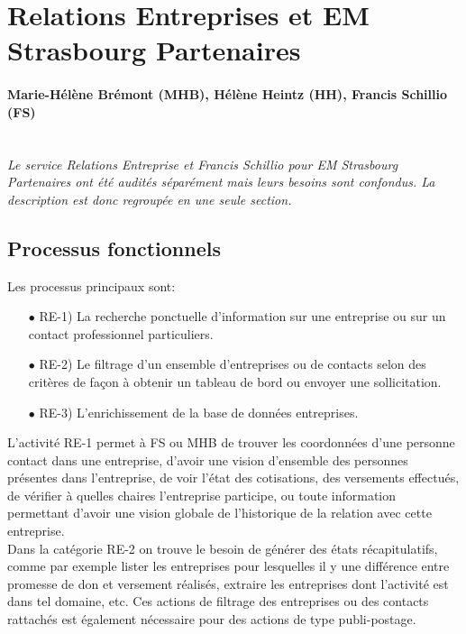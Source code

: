 \documentclass{book}
\begin{document}

\section{Relations Entreprises et EM Strasbourg Partenaires}

\paragraph{Marie-Hélène Brémont (MHB), Hélène Heintz (HH), Francis Schillio (FS)}
~\\

\textit{Le service Relations Entreprise et Francis Schillio pour 
EM Strasbourg Partenaires ont été audités séparément mais leurs 
besoins sont confondus. La description est donc regroupée en une 
seule section.}


\subsection{Processus fonctionnels}

Les processus principaux sont:
\begin{itemize}
\item[$\bullet$] RE-1) La recherche ponctuelle d'information sur une entreprise 
			     ou sur un contact professionnel particuliers.
\item[$\bullet$] RE-2) Le filtrage d'un ensemble d'entreprises ou de contacts
			     selon des critères de façon à obtenir un tableau de bord
			     ou envoyer une sollicitation. 
\item[$\bullet$] RE-3) L'enrichissement de la base de données entreprises.
\end{itemize}

\bigskip

L'activité RE-1  permet à FS  ou MHB de  trouver les coordonnées  d'une personne
contact  dans  une  entreprise,  d'avoir une  vision  d'ensemble  des  personnes
présentes  dans l'entreprise,  de voir  l'état des  cotisations, des  versements
effectués,  de  vérifier à  quelles  chaires  l'entreprise participe,  ou  toute
information permettant d'avoir une vision globale de l'historique de la relation
avec cette entreprise.\\

Dans la catégorie RE-2 on trouve  le besoin de générer des états récapitulatifs,
comme par  exemple lister les  entreprises pour  lesquelles il y  une différence
entre  promesse de  don et  versement  réalisés, extraire  les entreprises  dont
l'activité est dans tel domaine, etc. Ces actions de filtrage des entreprises ou
des  contacts  rattachés est  également  nécessaire  pour  des actions  de  type
publi-postage.\\
\end{document}
